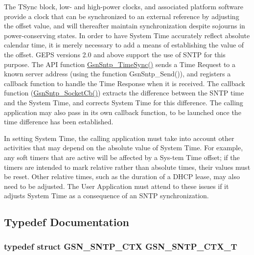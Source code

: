 \par
 The TSync block, low-\/ and high-\/power clocks, and associated platform software provide a clock that can be synchronized to an external reference by adjusting the offset value, and will thereafter maintain synchronization despite sojourns in power-\/conserving states. In order to have System Time accurately reflect absolute calendar time, it is merely necessary to add a means of establishing the value of the offset. GEPS versions 2.0 and above support the use of SNTP for this purpose. The API function \hyperlink{a00672_ga71cfb857bfbf8d5de080ef4f5807b0d0}{GsnSntp\_\-TimeSync()} sends a Time Request to a known server address (using the function GsnSntp\_\-Send()), and registers a callback function to handle the Time Response when it is received. The callback function (\hyperlink{a00585_a899703a2f77e7e303de46351018c09e8}{GsnSntp\_\-SocketCb()}) extracts the difference between the SNTP time and the System Time, and corrects System Time for this difference. The calling application may also pass in its own callback function, to be launched once the time difference has been established. \par
 \par
 In setting System Time, the calling application must take into account other activities that may depend on the absolute value of System Time. For example, any soft timers that are active will be affected by a Sys-\/tem Time offset; if the timers are intended to mark relative rather than absolute times, their values must be reset. Other relative times, such as the duration of a DHCP lease, may also need to be adjusted. The User Application must attend to these issues if it adjusts System Time as a consequence of an SNTP synchronization. 

\subsection{Typedef Documentation}
\hypertarget{a00672_gae0179c63a9e6988c361e8d0deb285a24}{
\subsubsection[{GSN\_\-SNTP\_\-CTX\_\-T}]{\setlength{\rightskip}{0pt plus 5cm}typedef struct {\bf GSN\_\-SNTP\_\-CTX}  {\bf GSN\_\-SNTP\_\-CTX\_\-T}}}
\label{a00672_gae0179c63a9e6988c361e8d0deb285a24}


